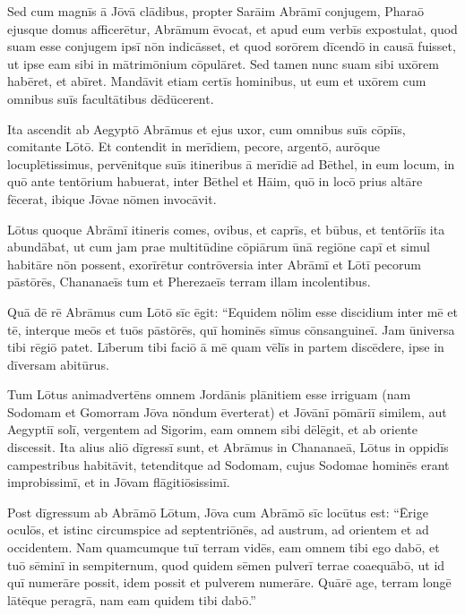 \Versus Sed cum magnīs ā Jōvā clādibus, propter Sarāim Abrāmī conjugem, Pharaō ejusque domus afficerētur,
\Versus Abrāmum ēvocat, et apud eum verbīs expostulat, quod suam esse conjugem ipsī nōn indicāsset,
\Versus et quod sorōrem dīcendō in causā fuisset, ut ipse eam sibi in mātrimōnium cōpulāret. Sed tamen nunc suam sibi uxōrem habēret, et abīret.
\Versus Mandāvit etiam certīs hominibus, ut eum et uxōrem cum omnibus suīs facultātibus dēdūcerent.



\Caput
\Versus Ita ascendit ab Aegyptō Abrāmus et ejus uxor, cum omnibus suīs cōpiīs, comitante Lōtō. Et contendit in merīdiem,
\Versus pecore, argentō, aurōque locuplētissimus,
\Versus pervēnitque suīs itineribus ā merīdiē ad Bēthel, in eum locum, in quō ante tentōrium habuerat, inter Bēthel et Hāim,
\Versus quō in locō prius altāre fēcerat, ibique Jōvae nōmen invocāvit.

\Versus Lōtus quoque Abrāmī itineris comes, ovibus, et caprīs, et būbus, et tentōriīs ita abundābat,
\Versus ut cum jam prae multitūdine cōpiārum ūnā regiōne capī et simul habitāre nōn possent,
\Versus exorīrētur contrōversia inter Abrāmī et Lōtī pecorum pāstōrēs, Chananaeīs tum et Pherezaeīs terram illam incolentibus.

\Versus Quā dē rē Abrāmus cum Lōtō sīc ēgit: ``Equidem nōlim esse discidium inter mē et tē, interque meōs et tuōs pāstōrēs, quī hominēs sīmus cōnsanguineī.
\Versus Jam ūniversa tibi rēgiō patet. Līberum tibi faciō ā mē quam vēlīs in partem discēdere, ipse in dīversam abitūrus.

\Versus Tum Lōtus animadvertēns omnem Jordānis plānitiem esse irriguam (nam Sodomam et Gomorram Jōva nōndum ēverterat) et Jōvānī pōmāriī similem, aut Aegyptiī solī, vergentem ad Sigorim,
\Versus eam omnem sibi dēlēgit, et ab oriente discessit. Ita alius aliō dīgressī sunt,
\Versus et Abrāmus in Chananaeā, Lōtus in oppidīs campestribus habitāvit, tetenditque ad Sodomam,
\Versus cujus Sodomae hominēs erant improbissimī, et in Jōvam flāgitiōsissimī.

\Versus Post dīgressum ab Abrāmō Lōtum, Jōva cum Abrāmō sīc locūtus est: ``Ērige oculōs, et istinc circumspice ad septentriōnēs, ad austrum, ad orientem et ad occidentem.
\Versus Nam quamcumque tuī terram vidēs, eam omnem tibi ego dabō, et tuō sēminī in sempiternum,
\Versus quod quidem sēmen pulverī terrae coaequābō, ut id quī numerāre possit, idem possit et pulverem numerāre.
\Versus Quārē age, terram longē lātēque peragrā, nam eam quidem tibi dabō.''

